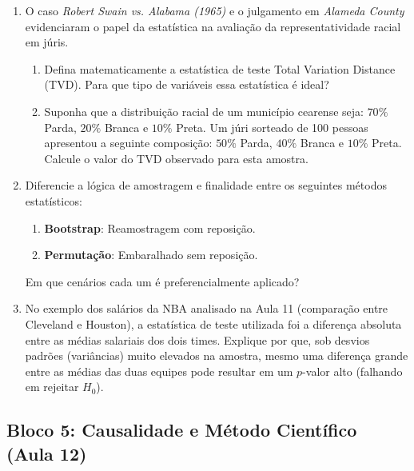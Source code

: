\documentclass[12pt]{article}
\begin{document}
\begin{enumerate}[label=\textbf{Questão \arabic*}, resume]
    \item O caso \textit{Robert Swain vs. Alabama (1965)} e o julgamento em \textit{Alameda County} evidenciaram o papel da estatística na avaliação da representatividade racial em júris.
    \begin{enumerate}[label=\alph*)]
        \item Defina matematicamente a estatística de teste Total Variation Distance (TVD). Para que tipo de variáveis essa estatística é ideal?
        \item Suponha que a distribuição racial de um município cearense seja: $70\%$ Parda, $20\%$ Branca e $10\%$ Preta. Um júri sorteado de 100 pessoas apresentou a seguinte composição: $50\%$ Parda, $40\%$ Branca e $10\%$ Preta. Calcule o valor do TVD observado para esta amostra.
    \end{enumerate}

    \item Diferencie a lógica de amostragem e finalidade entre os seguintes métodos estatísticos:
    \begin{enumerate}[label=\alph*)]
        \item \textbf{Bootstrap}: Reamostragem com reposição.
        \item \textbf{Permutação}: Embaralhado sem reposição.
    \end{enumerate}
    Em que cenários cada um é preferencialmente aplicado?

    \item No exemplo dos salários da NBA analisado na Aula 11 (comparação entre Cleveland e Houston), a estatística de teste utilizada foi a diferença absoluta entre as médias salariais dos dois times. Explique por que, sob desvios padrões (variâncias) muito elevados na amostra, mesmo uma diferença grande entre as médias das duas equipes pode resultar em um $p$-valor alto (falhando em rejeitar $H_0$).
\end{enumerate}

\subsection*{Bloco 5: Causalidade e Método Científico (Aula 12)}
\end{document}
